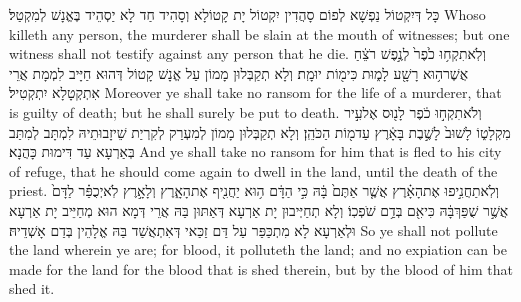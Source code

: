 {כָּל דְּיִקְטוֹל נַפְשָׁא לְפוֹם סָהֲדִין יִקְטוֹל יָת קָטוֹלָא וְסָהִיד חַד לָא יַסְהֵיד בֶּאֱנָשׁ לְמִקְטַל׃}
{Whoso killeth any person, the murderer shall be slain at the mouth of witnesses; but one witness shall not testify against any person that he die.}{}
{וְלֹֽא\maqqaf תִקְח֥וּ כֹ֙פֶר֙ לְנֶ֣פֶשׁ רֹצֵ֔חַ אֲשֶׁר\maqqaf ה֥וּא רָשָׁ֖ע לָמ֑וּת כִּי\maqqaf מ֖וֹת יוּמָֽת׃}
{וְלָא תְקַבְּלוּן מָמוֹן עַל אֱנָשׁ קָטוֹל דְּהוּא חַיָּיב לִמְמָת אֲרֵי אִתְקְטָלָא יִתְקְטִיל׃}
{Moreover ye shall take no ransom for the life of a murderer, that is guilty of death; but he shall surely be put to death.}{}
{וְלֹא\maqqaf תִקְח֣וּ כֹ֔פֶר לָנ֖וּס אֶל\maqqaf עִ֣יר מִקְלָט֑וֹ לָשׁוּב֙ לָשֶׁ֣בֶת בָּאָ֔רֶץ עַד\maqqaf מ֖וֹת הַכֹּהֵֽן׃}
{וְלָא תְקַבְּלוּן מָמוֹן לְמִעְרַק לְקִרְיַת שֵׁיזָבוּתֵיהּ לִמְתָּב לְמִתַּב בְּאַרְעָא עַד דִּימוּת כָּהֲנָא׃}
{And ye shall take no ransom for him that is fled to his city of refuge, that he should come again to dwell in the land, until the death of the priest.}{}
{וְלֹֽא\maqqaf תַחֲנִ֣יפוּ אֶת\maqqaf הָאָ֗רֶץ אֲשֶׁ֤ר אַתֶּם֙ בָּ֔הּ כִּ֣י הַדָּ֔ם ה֥וּא יַחֲנִ֖יף אֶת\maqqaf הָאָ֑רֶץ וְלָאָ֣רֶץ לֹֽא\maqqaf יְכֻפַּ֗ר לַדָּם֙ אֲשֶׁ֣ר שֻׁפַּךְ\maqqaf בָּ֔הּ כִּי\maqqaf אִ֖ם בְּדַ֥ם שֹׁפְכֽוֹ׃}
{וְלָא תְחַיְּיבוּן יָת אַרְעָא דְּאַתּוּן בַּהּ אֲרֵי דְּמָא הוּא מְחַיֵּיב יָת אַרְעָא וּלְאַרְעָא לָא מִתְכַּפַּר עַל דַּם זַכַּאי דְּאִתְאֲשַׁד בַּהּ אֱלָהֵין בְּדַם אָשְׁדֵיהּ׃}
{So ye shall not pollute the land wherein ye are; for blood, it polluteth the land; and no expiation can be made for the land for the blood that is shed therein, but by the blood of him that shed it.}{}
